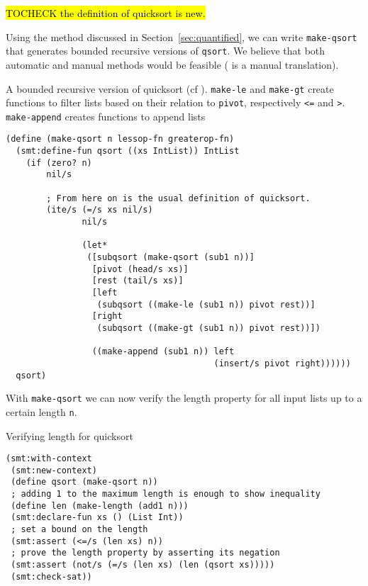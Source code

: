 \hl{TOCHECK the definition of quicksort is new.}

Using the method discussed in Section~\ref{sec:quantified}, we can write
\texttt{make-qsort} that generates bounded recursive versions of
\texttt{qsort}. We believe that both automatic and manual methods would be
feasible ( is a manual translation).

\begin{program}

\caption[A bounded recursive version of quicksort]{A bounded recursive version
of quicksort (cf ). \texttt{make-le} and \texttt{make-gt}
create functions to filter lists based on their relation to \texttt{pivot},
respectively \texttt{<=} and \texttt{>}. \texttt{make-append} creates
functions to append lists}

\label{fig:qsort-smt}
\begin{verbatim}
(define (make-qsort n lessop-fn greaterop-fn)
  (smt:define-fun qsort ((xs IntList)) IntList
    (if (zero? n)
        nil/s

        ; From here on is the usual definition of quicksort.
        (ite/s (=/s xs nil/s)
               nil/s

               (let*
                ([subqsort (make-qsort (sub1 n))]
                 [pivot (head/s xs)]
                 [rest (tail/s xs)]
                 [left
                  (subqsort ((make-le (sub1 n)) pivot rest))]
                 [right
                  (subqsort ((make-gt (sub1 n)) pivot rest))])

                 ((make-append (sub1 n)) left
                                         (insert/s pivot right))))))
  qsort)
\end{verbatim}
\end{program}

With \texttt{make-qsort} we can now verify the length property for all input
lists up to a certain length \texttt{n}.

\begin{program}
\caption{Verifying length for quicksort}
\begin{verbatim}
(smt:with-context
 (smt:new-context)
 (define qsort (make-qsort n))
 ; adding 1 to the maximum length is enough to show inequality
 (define len (make-length (add1 n)))
 (smt:declare-fun xs () (List Int))
 ; set a bound on the length
 (smt:assert (<=/s (len xs) n))
 ; prove the length property by asserting its negation
 (smt:assert (not/s (=/s (len xs) (len (qsort xs)))))
 (smt:check-sat))
\end{verbatim}
\end{program}

